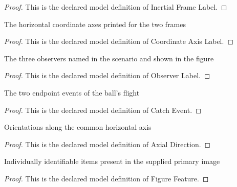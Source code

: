 \begin{proof}
  This is the declared model definition of Inertial Frame Label.
\end{proof}
\begin{definition}
  \label{def:physics:phyx-mini-0529:phyxminiproblems-problemphyxmini0529-coordinateaxislabel}
  The horizontal coordinate axes printed for the two frames
\end{definition}
\begin{proof}
  This is the declared model definition of Coordinate Axis Label.
\end{proof}
\begin{definition}
  \label{def:physics:phyx-mini-0529:phyxminiproblems-problemphyxmini0529-observerlabel}
  The three observers named in the scenario and shown in the figure
\end{definition}
\begin{proof}
  This is the declared model definition of Observer Label.
\end{proof}
\begin{definition}
  \label{def:physics:phyx-mini-0529:phyxminiproblems-problemphyxmini0529-catchevent}
  The two endpoint events of the ball's flight
\end{definition}
\begin{proof}
  This is the declared model definition of Catch Event.
\end{proof}
\begin{definition}
  \label{def:physics:phyx-mini-0529:phyxminiproblems-problemphyxmini0529-axialdirection}
  Orientations along the common horizontal axis
\end{definition}
\begin{proof}
  This is the declared model definition of Axial Direction.
\end{proof}
\begin{definition}
  \label{def:physics:phyx-mini-0529:phyxminiproblems-problemphyxmini0529-figurefeature}
  Individually identifiable items present in the supplied primary image
\end{definition}
\begin{proof}
  This is the declared model definition of Figure Feature.
\end{proof}
